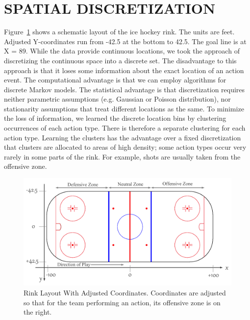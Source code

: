 \section{SPATIAL DISCRETIZATION} \label{sec:locations} Figure~\ref{fig:rink} shows a schematic layout of the ice hockey rink. The units are feet. Adjusted Y-coordinates  run from -42.5 at the bottom to 42.5. The goal line is at X = 89. 
 While the data provide continuous locations, we took the approach of discretizing the continuous space into a discrete set. The disadvantage to this approach is that it loses some information about the exact location of an action event. The computational advantage is that we can employ algorithms for discrete Markov models. The statistical advantage is that discretization requires neither parametric assumptions (e.g. Gaussian or Poisson distribution), nor stationarity assumptions that treat different locations as the same.  To minimize the loss of information, we learned the discrete location bins by clustering occurrences of each action type. There is therefore a separate clustering for each action type. Learning the clusters has the advantage over a fixed discretization that clusters are allocated to areas of high density; some action types occur very rarely in some parts of the rink. For example, shots are usually taken from the offensive zone.%

\begin{figure} \centering
		\includegraphics[width=1\textwidth]{rink}
		\caption{Rink Layout With Adjusted Coordinates. Coordinates are adjusted so that for the team performing an action, its offensive zone is on the right.}
		\label{fig:rink}
\end{figure}

